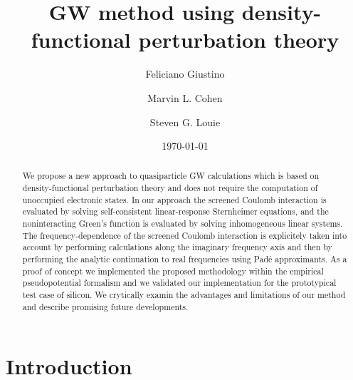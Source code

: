 \documentclass[twocolumn,prb,showpacs,superscriptaddress]{revtex4}
\begin{document}
\title{GW method using density-functional perturbation theory}

\author{Feliciano Giustino}
\author{Marvin L. Cohen}
\author{Steven G. Louie}
\date{\today}

\begin{abstract}
We propose a new approach to quasiparticle GW calculations which 
is based on density-functional perturbation theory and
does not require the computation of unoccupied electronic states. In our approach 
the screened Coulomb interaction
is evaluated by solving self-consistent linear-response Sternheimer equations,
and the noninteracting Green's function is evaluated by solving inhomogeneous 
linear systems. The frequency-dependence of the screened Coulomb interaction 
is explicitely taken into account by performing calculations along the imaginary
frequency axis and then by performing the analytic continuation to real frequencies
using Pad\'e approximants. As a proof of concept we implemented the proposed methodology
within the empirical pseudopotential formalism and we validated our implementation
for the prototypical test case of silicon. We crytically examin the advantages and
limitations of our method and describe promising future developments.
\end{abstract}


\maketitle

\section{Introduction}
\end{document}
